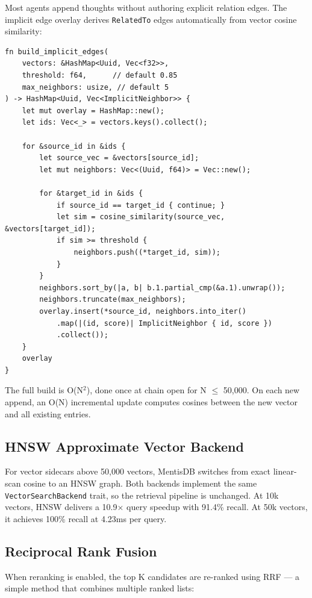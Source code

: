\documentclass[11pt,a4paper]{article}
\begin{document}
Most agents append thoughts without authoring explicit relation edges. The implicit edge
overlay derives \texttt{RelatedTo} edges automatically from vector cosine similarity:

\begin{lstlisting}
fn build_implicit_edges(
    vectors: &HashMap<Uuid, Vec<f32>>,
    threshold: f64,      // default 0.85
    max_neighbors: usize, // default 5
) -> HashMap<Uuid, Vec<ImplicitNeighbor>> {
    let mut overlay = HashMap::new();
    let ids: Vec<_> = vectors.keys().collect();

    for &source_id in &ids {
        let source_vec = &vectors[source_id];
        let mut neighbors: Vec<(Uuid, f64)> = Vec::new();

        for &target_id in &ids {
            if source_id == target_id { continue; }
            let sim = cosine_similarity(source_vec, &vectors[target_id]);
            if sim >= threshold {
                neighbors.push((*target_id, sim));
            }
        }
        neighbors.sort_by(|a, b| b.1.partial_cmp(&a.1).unwrap());
        neighbors.truncate(max_neighbors);
        overlay.insert(*source_id, neighbors.into_iter()
            .map(|(id, score)| ImplicitNeighbor { id, score })
            .collect());
    }
    overlay
}
\end{lstlisting}

The full build is O(N$^2$), done once at chain open for N $\leq$ 50,000. On each new
append, an O(N) incremental update computes cosines between the new vector and all existing
entries.

\subsection{HNSW Approximate Vector Backend}

For vector sidecars above 50,000 vectors, MentisDB switches from exact linear-scan cosine
to an HNSW graph. Both backends implement the same \texttt{VectorSearchBackend} trait, so
the retrieval pipeline is unchanged. At 10k vectors, HNSW delivers a 10.9$\times$ query
speedup with 91.4\% recall. At 50k vectors, it achieves 100\% recall at 4.23ms per query.

\subsection{Reciprocal Rank Fusion}

When reranking is enabled, the top K candidates are re-ranked using RRF — a simple method
that combines multiple ranked lists:
\end{document}
